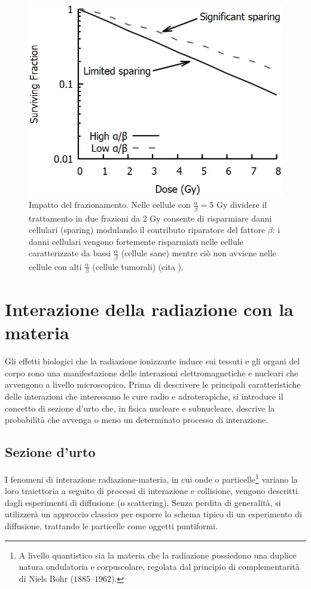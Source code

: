 \documentclass[12pt,a4paper,twoside]{report}
\begin{document}
	\begin{figure}[H]
		\centering
		\includegraphics[width=0.9\linewidth]{images/sparing.jpg}
		\caption{Impatto del frazionamento. Nelle cellule con $\frac{\alpha}{\beta}=5\mbox{ Gy}$ dividere il trattamento in due frazioni da $2\mbox{ Gy}$ consente di risparmiare danni cellulari (sparing) modulando il contributo riparatore del fattore $\beta$: i danni cellulari vengono fortemente risparmiati nelle cellule caratterizzate da bassi $\frac{\alpha}{\beta}$ (cellule sane) mentre ciò non avviene nelle cellule con alti $\frac{\alpha}{\beta}$ (cellule tumorali) (cita
			).}
		\label{fig:sparing}
	\end{figure}
	
	\section{Interazione della radiazione con la materia}
	Gli effetti biologici che la radiazione ionizzante induce sui tessuti e gli organi del corpo sono una manifestazione delle interazioni elettromagnetiche e nucleari che avvengono a livello microscopico. Prima di descrivere le principali caratteristiche delle interazioni che interessano le cure radio e adroterapiche, si introduce il concetto di sezione d'urto che, in fisica nucleare e subnucleare, descrive la probabilità che avvenga o meno un determinato processo di interazione.
	
	\subsection{Sezione d'urto}
	I fenomeni di interazione radiazione-materia, in cui onde o particelle\footnote{A livello quantistico sia la materia che la radiazione possiedono una duplice natura ondulatoria e corpuscolare, regolata dal principio di complementarità di Niels Bohr ($1885$--$1962$).} variano la loro traiettoria a seguito di processi di interazione e collisione, vengono descritti dagli esperimenti di diffusione (o scattering). Senza perdita di generalità, si utilizzerà un approccio classico per esporre lo schema tipico di un esperimento di diffusione, trattando le particelle come oggetti puntiformi.
	
\end{document}
